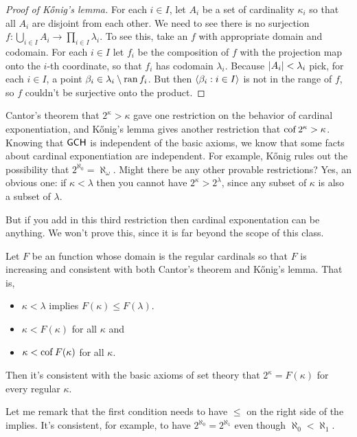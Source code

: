 \documentclass[10pt]{amsart}
\begin{document}
\begin{proof}[Proof of K\H{o}nig's lemma]
For each $i \in I$, let $A_i$ be a set of cardinality $\kappa_i$ so that all $A_i$ are disjoint from each other. We need to see there is no surjection $f : \bigcup_{i \in I} A_i \to \prod_{i \in I} \lambda_i$. To see this, take an $f$ with appropriate domain and codomain. For each $i \in I$ let $f_i$ be the composition of $f$ with the projection map onto the $i$-th coordinate, so that $f_i$ has codomain $\lambda_i$. Because $\left\lvert A_i \right\rvert < \lambda_i$ pick, for each $i \in I$, a point $\beta_i \in \lambda_i \setminus \operatorname{ran} f_i$. But then ${\left\langle \beta_i : i \in I \right\rangle}$ is not in the range of $f$, so $f$ couldn't be surjective onto the product.
\end{proof}

Cantor's theorem that $2^\kappa > \kappa$ gave one restriction on the behavior of cardinal exponentiation, and K\H{o}nig's lemma gives another restriction that $\operatorname{cof} 2^\kappa > \kappa$. Knowing that $\mathsf{GCH}$ is independent of the basic axioms, we know that some facts about cardinal exponentiation are independent. For example, K\H{o}nig rules out the possibility that $2^{\aleph_0} = \aleph_\omega$. Might there be any other provable restrictions? Yes, an obvious one: if $\kappa < \lambda$ then you cannot have $2^\kappa > 2^\lambda$, since any subset of $\kappa$ is also a subset of $\lambda$.

But if you add in this third restriction then cardinal exponentation can be anything. We won't prove this, since it is far beyond the scope of this class.

\begin{theorem}
Let $F$ be an function whose domain is the regular cardinals so that $F$ is increasing and consistent with both Cantor's theorem and K\H{o}nig's lemma. That is, 
\begin{itemize}
\item $\kappa < \lambda$ implies $F(\kappa) \le F(\lambda)$.
\item $\kappa < F(\kappa)$ for all $\kappa$ and
\item $\kappa < \operatorname{cof} F(\kappa)$ for all $\kappa$.
\end{itemize}
Then it's consistent with the basic axioms of set theory that $2^\kappa = F(\kappa)$ for every regular $\kappa$.
\end{theorem}



Let me remark that the first condition needs to have $\le$ on the right side of the implies. It's consistent, for example, to have $2^{\aleph_0} = 2^{\aleph_1}$ even though $\aleph_0 < \aleph_1$.
\end{document}
